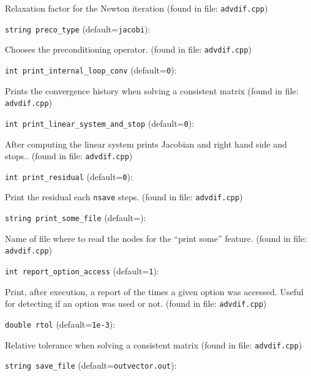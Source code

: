 Relaxation factor for the Newton iteration
 (found in file: \verb+advdif.cpp+)
\item\verb+string preco_type+ {\rm(default=\verb|jacobi|)}:

Chooses the preconditioning operator. 
 (found in file: \verb+advdif.cpp+)
\item\verb+int print_internal_loop_conv+ {\rm(default=\verb|0|)}:

Prints the convergence history when solving a consistent matrix
 (found in file: \verb+advdif.cpp+)
\item\verb+int print_linear_system_and_stop+ {\rm(default=\verb|0|)}:

After computing the linear system prints Jacobian and
right hand side and stops.. 
 (found in file: \verb+advdif.cpp+)
\item\verb+int print_residual+ {\rm(default=\verb|0|)}:

Print the residual each  \verb+nsave+  steps. 
 (found in file: \verb+advdif.cpp+)
\item\verb+string print_some_file+ {\rm(default=\verb||)}:

Name of file where to read the nodes for the ``print some'' 
feature. 
 (found in file: \verb+advdif.cpp+)
\item\verb+int report_option_access+ {\rm(default=\verb|1|)}:

Print, after execution, a report of the times a given option
was accessed. Useful for detecting if an option was used or not.
 (found in file: \verb+advdif.cpp+)
\item\verb+double rtol+ {\rm(default=\verb|1e-3|)}:

Relative tolerance when solving a consistent matrix
 (found in file: \verb+advdif.cpp+)
\item\verb+string save_file+ {\rm(default=\verb|outvector.out|)}:

